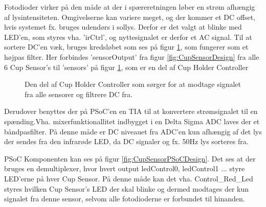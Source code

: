 \documentclass[Rapport/Rapport_main.tex]{subfiles}
\begin{document}
Fotodioder virker på den måde at der i spæreretningen løber en strøm afhængig af lysintensiteten. Omgivelserne kan variere meget, og der kommer et DC offset, hvis systemet fx. bruges udendørs i sollys. Derfor er det valgt at blinke med LED'en, som styres vha. 'irCtrl', og nyttesignalet er derfor et AC signal. Til at sortere DC'en væk, bruges kredsløbet som ses på figur \ref{fig:CupSensorCupHolderControllerPart}, som fungerer som et højpas filter. Her forbindes 'sensorOutput' fra figur \ref{fig:CupSensorDesign} fra alle 6 Cup Sensor's til 'sensors' på figur \ref{fig:CupSensorCupHolderControllerPart}, som er en del af Cup Holder Controller 

\begin{figure}[H]
    \centering
    \caption{Den del af Cup Holder Controller som sørger for at modtage signalet fra alle sensorer og filtrere DC fra.}
    \label{fig:CupSensorCupHolderControllerPart}
\end{figure}

Derudover benyttes der på PSoC'en en TIA til at konvertere strømsignalet til en spænding.Vha. mixerfunktionallitet indbygget i en Delta Sigma ADC laves der et båndpasfilter. På denne måde er DC niveauet fra ADC'en kun afhængig af det lys der sendes fra den infrarøde LED, da DC signaler og fx. 50Hz lys sorteres fra.

PSoC Komponenten kan ses på figur \ref{fig:CupSensorPSoCDesign}. Det ses at der bruges en demultiplexer, hvor hvert output ledControl0, ledControl1 ... styre LED'erne på hver Cup Sensor. På denne måde kan det vha. Control\_Red\_Led styres hvilken Cup Sensor's LED der skal blinke og dermed modtages der kun signalet fra denne sensor, selvom alle fotodioderne er forbundet til hinanden.  
\end{document}
